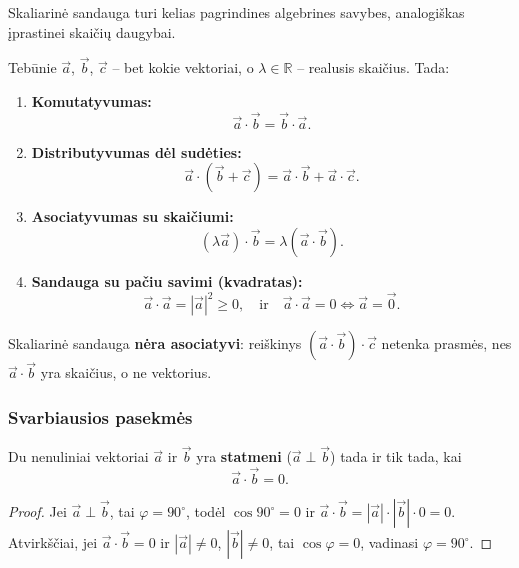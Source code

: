 Skaliarinė sandauga turi kelias pagrindines algebrines savybes, analogiškas įprastinei skaičių daugybai.

\begin{theorem}
Tebūnie $\vec{a}$, $\vec{b}$, $\vec{c}$ -- bet kokie vektoriai, o $\lambda \in \mathbb{R}$ -- realusis skaičius. Tada:
\begin{enumerate}[label=\arabic*.]
    \item \textbf{Komutatyvumas:}
    \[
    \vec{a} \cdot \vec{b} = \vec{b} \cdot \vec{a}.
    \]
    \item \textbf{Distributyvumas dėl sudėties:}
    \[
    \vec{a} \cdot (\vec{b} + \vec{c}) = \vec{a} \cdot \vec{b} + \vec{a} \cdot \vec{c}.
    \]
    \item \textbf{Asociatyvumas su skaičiumi:}
    \[
    (\lambda \vec{a}) \cdot \vec{b} = \lambda (\vec{a} \cdot \vec{b}).
    \]
    \item \textbf{Sandauga su pačiu savimi (kvadratas):}
    \[
    \vec{a} \cdot \vec{a} = |\vec{a}|^2 \geq 0, \quad \text{ir} \quad \vec{a} \cdot \vec{a} = 0 \iff \vec{a} = \vec{0}.
    \]
\end{enumerate}
\end{theorem}

\begin{remark}
Skaliarinė sandauga \textbf{nėra asociatyvi}: reiškinys $(\vec{a} \cdot \vec{b}) \cdot \vec{c}$ netenka prasmės, nes $\vec{a} \cdot \vec{b}$ yra skaičius, o ne vektorius.
\end{remark}

\subsubsection*{Svarbiausios pasekmės}

\begin{corollary}[Statmenumas]
Du nenuliniai vektoriai $\vec{a}$ ir $\vec{b}$ yra \textbf{statmeni} ($\vec{a} \perp \vec{b}$) tada ir tik tada, kai
\[
\vec{a} \cdot \vec{b} = 0.
\]
\end{corollary}

\begin{proof}
Jei $\vec{a} \perp \vec{b}$, tai $\varphi = 90^\circ$, todėl $\cos 90^\circ = 0$ ir $\vec{a} \cdot \vec{b} = |\vec{a}| \cdot |\vec{b}| \cdot 0 = 0$.
Atvirkščiai, jei $\vec{a} \cdot \vec{b} = 0$ ir $|\vec{a}| \neq 0$, $|\vec{b}| \neq 0$, tai $\cos\varphi = 0$, vadinasi $\varphi = 90^\circ$.
\end{proof}

